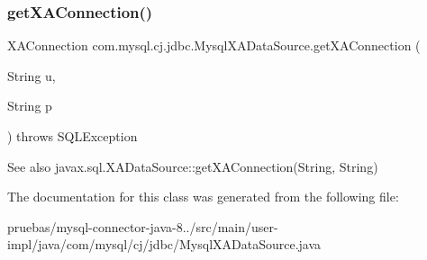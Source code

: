 \subsubsection{\texorpdfstring{get\+X\+A\+Connection()}{getXAConnection()}\hspace{0.1cm}{\footnotesize\ttfamily [2/2]}}
{\footnotesize\ttfamily X\+A\+Connection com.\+mysql.\+cj.\+jdbc.\+Mysql\+X\+A\+Data\+Source.\+get\+X\+A\+Connection (\begin{DoxyParamCaption}\item[{String}]{u,  }\item[{String}]{p }\end{DoxyParamCaption}) throws S\+Q\+L\+Exception}

\begin{DoxySeeAlso}{See also}
javax.\+sql.\+X\+A\+Data\+Source\+::get\+X\+A\+Connection(\+String, String) 
\end{DoxySeeAlso}


The documentation for this class was generated from the following file\+:\begin{DoxyCompactItemize}
\item 
pruebas/mysql-\/connector-\/java-\/8../src/main/user-\/impl/java/com/mysql/cj/jdbc/Mysql\+X\+A\+Data\+Source.\+java\end{DoxyCompactItemize}
